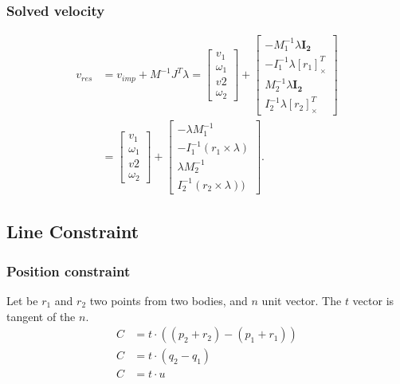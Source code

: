 \documentclass{article}
\begin{document}
	\subsubsection{Solved velocity}
	\begin{align*}
		v_{res}&=v_{imp}+M^{-1}J^T\lambda=
		\begin{bmatrix}
			v_1\\
			\omega_1\\
			v2\\
			\omega_2
		\end{bmatrix}
		+
		\begin{bmatrix}
			-M_1^{-1}\lambda\boldsymbol{I_2}\\
			-I_1^{-1}\lambda[r_1]_\times^T\\
			M_2^{-1}\lambda\boldsymbol{I_2}\\
			I_2^{-1}\lambda[r_2]_\times^T
		\end{bmatrix}\\
		&=
		\begin{bmatrix}
			v_1\\
			\omega_1\\
			v2\\
			\omega_2
		\end{bmatrix}
		+
		\begin{bmatrix}
			-\lambda M_1^{-1}\\
			-I_1^{-1}(r_1\times \lambda)\\
			\lambda M_2^{-1}\\
			I_2^{-1}(r_2\times \lambda))
		\end{bmatrix}.
	\end{align*}
	\newpage
	\subsection{Line Constraint}
	\subsubsection{Position constraint}
	Let be $r_1$ and $r_2$ two points from two bodies, and $n$ unit vector. The $t$ vector is tangent of the $n$.
	\begin{align*}
		C &= t\cdot((p_2+r_2)-(p_1+r_1))\\
		C &= t\cdot(q_2-q_1)\\
		C &= t\cdot u
	\end{align*}
\end{document}
